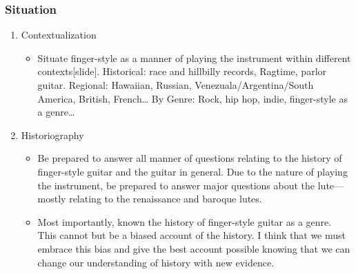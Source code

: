 \documentclass[11pt]{article}
\begin{document}
\subsubsection{Situation}
\label{sec-1-2-1}
\begin{enumerate}
\item Contextualization
\label{sec-1-2-1-1}
\begin{itemize}
\item Situate finger-style as a manner of playing the instrument within different
contexts[slide]. Historical: race and hillbilly records, Ragtime, parlor
guitar. Regional: Hawaiian, Russian, Venezuala/Argentina/South America,
British, French\ldots{} By Genre: Rock, hip hop, indie, finger-style as a
genre\ldots{}
\end{itemize}
\item Historiography
\label{sec-1-2-1-2}
\begin{itemize}
\item Be prepared to answer all manner of questions relating to the history of
finger-style guitar and the guitar in general. Due to the nature of playing
the instrument, be prepared to answer major questions about the
lute---mostly relating to the renaissance and baroque lutes.

\item Most importantly, known the history of finger-style guitar as a genre. This
cannot but be a biased account of the history. I think that we must embrace
this bias and give the best account possible knowing that we can change our
understanding of history with new evidence.
\end{itemize}
\end{enumerate}
\end{document}
